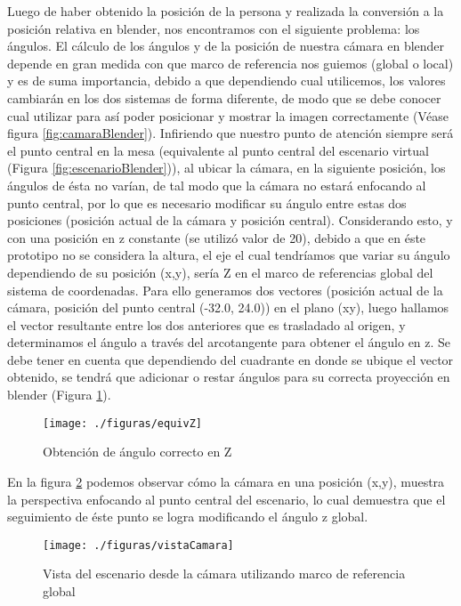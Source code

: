\documentclass[a4paper,openright,12pt]{report}
\begin{document}
Luego de haber obtenido la posición de la persona y realizada la conversión a la posición relativa en blender, nos encontramos con el siguiente problema: los ángulos. El cálculo de los ángulos y de la posición de nuestra cámara en blender depende en gran medida con que marco de referencia nos guiemos (global o local) y es de suma importancia, debido a que dependiendo cual utilicemos, los valores cambiarán en los dos sistemas de forma diferente, de modo que se debe conocer cual utilizar para así poder posicionar y mostrar la imagen correctamente (Véase figura \ref{fig:camaraBlender}). Infiriendo que nuestro punto de atención siempre será el punto central en la mesa (equivalente al punto central del escenario virtual (Figura \ref{fig:escenarioBlender})), al ubicar la cámara, en la siguiente posición, los ángulos de ésta no varían, de tal modo que la cámara no estará enfocando al punto central, por lo que es necesario modificar su ángulo entre estas dos posiciones (posición actual de la cámara y posición central). Considerando esto, y con una posición en z constante (se utilizó valor de 20), debido a que en éste prototipo no se considera la altura, el eje el cual tendríamos que variar su ángulo dependiendo de su posición (x,y), sería Z en el marco de referencias global del sistema de coordenadas. Para ello generamos dos vectores (posición actual de la cámara, posición del punto central (-32.0, 24.0)) en el plano (xy), luego hallamos el vector resultante entre los dos anteriores que es trasladado al origen, y determinamos el ángulo a través del arcotangente para obtener el ángulo en z. Se debe tener en cuenta que dependiendo del cuadrante en donde se ubique el vector obtenido, se tendrá que adicionar o restar ángulos para su correcta proyección en blender (Figura \ref{fig:equivZ}).
\begin{figure}[H]
	\centering
	\texttt{[image: ./figuras/equivZ]}
	\caption{Obtención de ángulo correcto en Z} \label{fig:equivZ}
\end{figure}
En la figura \ref{fig:vistaCamara} podemos observar cómo la cámara en una posición (x,y), muestra la perspectiva enfocando al punto central del escenario, lo cual demuestra que el seguimiento de éste punto se logra modificando el ángulo z global.
\begin{figure}[thb]
	\centering
	\texttt{[image: ./figuras/vistaCamara]}
	\caption[Vista del escenario desde la cámara]{Vista del escenario desde la cámara utilizando marco de referencia global} \label{fig:vistaCamara}
\end{figure}\\
\end{document}
